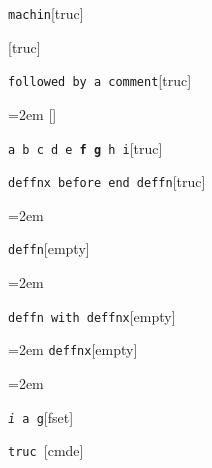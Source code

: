 \documentclass{book}
\begin{document}
%
\noindent\texttt\bgroup{}machin\egroup{}\hfill[truc]



%
\noindent\texttt\bgroup{}\egroup{}\hfill[truc]



\noindent\texttt\bgroup{}followed by a comment\egroup{}\hfill[truc]



%
\par\begingroup\obeylines\obeyspaces\frenchspacing\leftskip=2em\relax\parskip=0pt\relax\ttfamily{}%
\endgroup{}%
\noindent\texttt\bgroup{}\egroup{}\hfill[]



\noindent\texttt\bgroup{}a b c d e \textbf{f g} h i\egroup{}\hfill[truc]



%
\noindent\texttt\bgroup{}deffnx before end deffn\egroup{}\hfill[truc]



%
\par\begingroup\obeylines\obeyspaces\frenchspacing\leftskip=2em\relax\parskip=0pt\relax\ttfamily{}%


\endgroup{}%
\noindent\texttt\bgroup{}deffn\egroup{}\hfill[empty]



%
\par\begingroup\obeylines\obeyspaces\frenchspacing\leftskip=2em\relax\parskip=0pt\relax\ttfamily{}%

\endgroup{}%
\noindent\texttt\bgroup{}deffn with deffnx\egroup{}\hfill[empty]



%
\par\begingroup\obeylines\obeyspaces\frenchspacing\leftskip=2em\relax\parskip=0pt\relax\ttfamily{}%
\endgroup{}%
\noindent\texttt\bgroup{}deffnx\egroup{}\hfill[empty]



%
\par\begingroup\obeylines\obeyspaces\frenchspacing\leftskip=2em\relax\parskip=0pt\relax\ttfamily{}%

\endgroup{}%
\noindent\texttt\bgroup{}\emph{i} a g\egroup{}\hfill[fset]



%
\noindent\texttt\bgroup{}truc \egroup{}\hfill[cmde]
\end{document}
